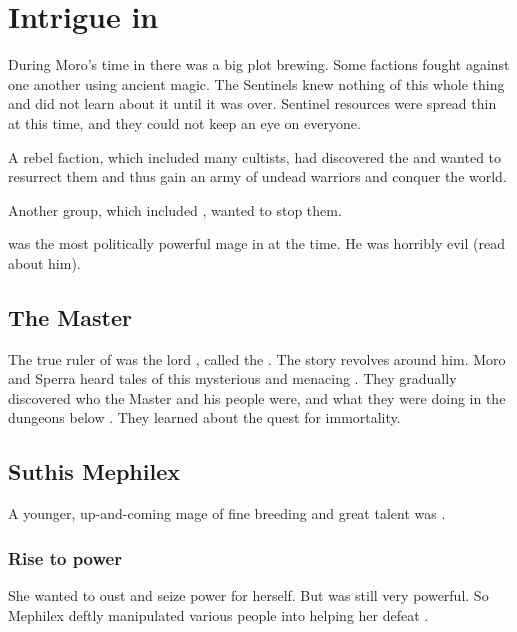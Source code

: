\section{Intrigue in \Yormis}
During Moro's time in \Yormis there was a big plot brewing.
Some factions fought against one another using ancient magic.
The Sentinels knew nothing of this whole thing and did not learn about it until it was over.
Sentinel resources were spread thin at this time, and they could not keep an eye on everyone.

A rebel faction, which included many \Ubloth cultists, had discovered the  and wanted to resurrect them and thus gain an army of undead warriors and conquer the world. 

Another group, which included , wanted to stop them. 

 was the most politically powerful mage in \Yormis at the time. 
He was horribly evil (read about him). 









\subsection{The Master}
The true ruler of \Yormis was the \ophidian lord , called the . 
The story revolves around him.
Moro and Sperra heard tales of this mysterious and menacing . 
They gradually discovered who the Master and his people were, and what they were doing in the dungeons below \Yormis.
They learned about the \ophidian quest for immortality.









\subsection{Suthis Mephilex}
A younger, up-and-coming mage of fine breeding and great talent was . 




\subsubsection{Rise to power}
She wanted to oust \Uldraan and seize power for herself. 
But \Uldraan was still very powerful.
So Mephilex deftly manipulated various people into helping her defeat \Uldraan. 















